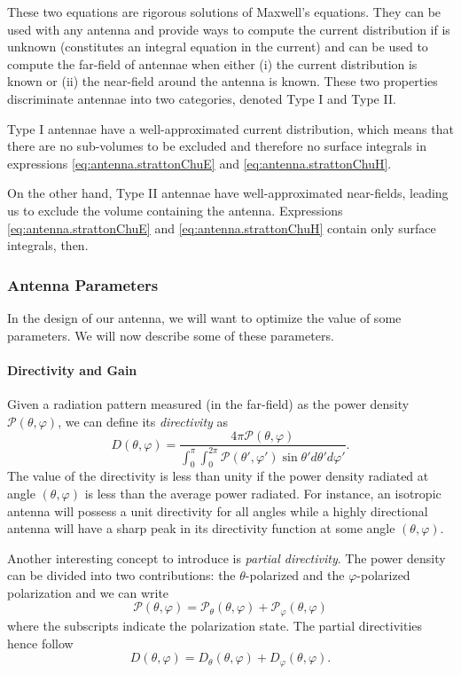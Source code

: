 These two equations are rigorous solutions of Maxwell's equations. 
They can be used with any antenna and provide ways to compute the 
current distribution if is unknown (constitutes an integral equation in the current)
and can be used to compute the far-field of antennae when either 
(i) the current distribution is known or (ii) the near-field around the antenna
is known. 
These two properties discriminate antennae into two categories, denoted Type I and Type II.

Type I antennae have a well-approximated current distribution, which means that there are no
sub-volumes to be excluded and therefore no surface integrals in expressions 
\eqref{eq:antenna.strattonChuE} and \eqref{eq:antenna.strattonChuH}. 

On the other hand, Type II antennae have well-approximated near-fields, leading
us to exclude the volume containing the antenna. Expressions \eqref{eq:antenna.strattonChuE}
and \eqref{eq:antenna.strattonChuH} contain only surface integrals, then. 

\subsubsection{Antenna Parameters}
In the design of our antenna, we will want to optimize the value
of some parameters. We will now describe some of these parameters.

\paragraph[Directivity and Gain]{Directivity and Gain \cite[\S 1.16]{ELL2003}}
Given a radiation pattern measured (in the far-field) as the power density 
$\mathcal{P}(\theta,\varphi)$, we can define its \textit{directivity}
as
  \begin{equation}
   D(\theta,\varphi) = \frac{4\pi\mathcal{P}(\theta,\varphi)}
			{\int_0^\pi\int_0^{2\pi}\mathcal{P}(\theta',\varphi')\sin\theta'd\theta'd\varphi'}.
  \end{equation}
The value of the directivity is less than unity if the power density radiated at angle $(\theta,\varphi)$
is less than the average power radiated. For instance, an isotropic antenna will possess a unit directivity
for all angles while a highly directional antenna will have a sharp peak  in its directivity function 
at some angle $(\theta,\varphi)$.

Another interesting concept to introduce is \textit{partial directivity}. 
The power density can be divided into two contributions: the $\theta$-polarized
and the $\varphi$-polarized polarization and we can write
  \begin{equation}
    \mathcal{P}(\theta,\varphi) = \mathcal{P}_\theta(\theta,\varphi)+\mathcal{P}_\varphi(\theta,\varphi)
  \end{equation}
where the subscripts indicate the polarization state. The partial 
directivities hence follow
  \begin{equation}
   D(\theta,\varphi) = D_\theta(\theta,\varphi)+D_\varphi(\theta,\varphi).
  \end{equation}


